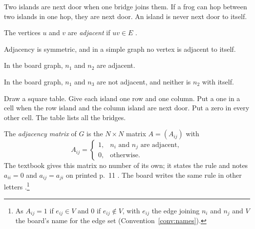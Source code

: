 \plainwords{} Two islands are next door when one bridge joins them. If a
frog can hop between two islands in one hop, they are next door. An island
is never next door to itself.

\begin{definition}\label{def:adjacent}
The vertices $u$ and $v$ are \emph{adjacent} if $uv\in E$
\cite[Definition~1.1.4, p.~11]{petrosyan2015graphs}.
\end{definition}

\begin{remark}
Adjacency is symmetric, and in a simple graph no vertex is adjacent to
itself.
\end{remark}
\begin{example}
In the board graph, $n_1$ and $n_2$ are adjacent.
\end{example}
\begin{nonexample}
In the board graph, $n_1$ and $n_3$ are not adjacent, and neither is
$n_2$ with itself.
\end{nonexample}

\plainwords{} Draw a square table. Give each island one row and one
column. Put a one in a cell when the row island and the column island are
next door. Put a zero in every other cell. The table lists all the
bridges.

\begin{definition}\label{def:matrix}
The \emph{adjacency matrix} of $G$ is the $N\times N$ matrix $A=(A_{ij})$
with
\begin{equation}\label{eq:adj}
A_{ij}=\begin{cases}1,& n_i \text{ and } n_j \text{ are adjacent},\\
0,& \text{otherwise.}\end{cases}
\end{equation}
The textbook gives this matrix no number of its own; it states the rule
and notes $a_{ii}=0$ and $a_{ij}=a_{ji}$ on printed p.~11
\cite{petrosyan2015graphs}. The board writes the same rule in other letters
\cite{whiteboard1,whiteboard2}.\footnote{As $A_{ij}=1$ if $e_{ij}\in V$ and
$0$ if $e_{ij}\notin V$, with $e_{ij}$ the edge joining $n_i$ and $n_j$ and
$V$ the board's name for the edge set (Convention~\ref{conv:names}).}
\end{definition}

